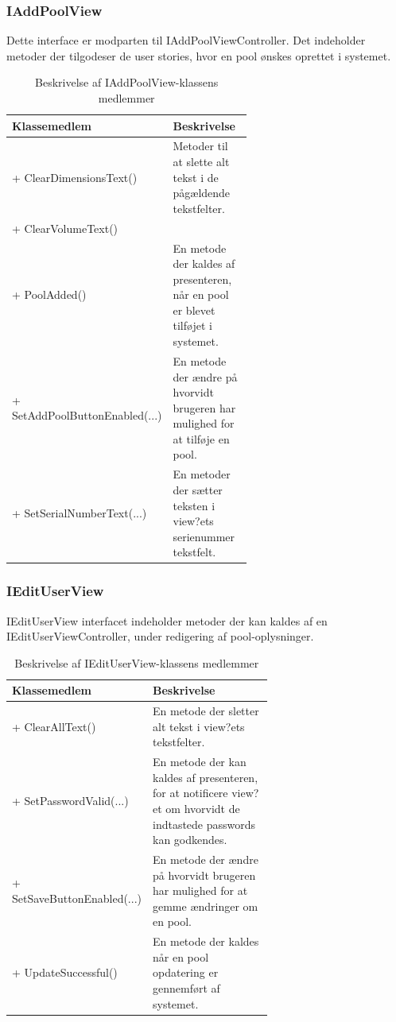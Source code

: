 \subsubsection{IAddPoolView}
Dette interface er modparten til IAddPoolViewController. Det indeholder metoder der tilgodeser de user stories, hvor en pool ønskes oprettet i systemet.

\begin{table}
	\centering
	\begin{tabular}{| l | p{0.6\linewidth} |}
		\toprule
		\textbf{Klassemedlem}	& \textbf{Beskrivelse} \\
		\midrule
		+ ClearDimensionsText()				& Metoder til at slette alt tekst i de pågældende tekstfelter. \\
		+ ClearVolumeText()					& \\\hline
		+ PoolAdded()				& En metode der kaldes af presenteren, når en pool er blevet tilføjet i systemet. \\\hline
		+ SetAddPoolButtonEnabled(...)				& En metode der ændre på hvorvidt brugeren har mulighed for at tilføje en pool. \\\hline
		+ SetSerialNumberText(...) 					& En metoder der sætter teksten i view?ets serienummer tekstfelt. \\
		\bottomrule
		\end{tabular}
	\caption{Beskrivelse af IAddPoolView-klassens medlemmer}
	\label{tab:table_design_iaddpoolview}	
\end{table}

\subsubsection{IEditUserView}
IEditUserView interfacet indeholder metoder der kan kaldes af en IEditUserViewController, under redigering af pool-oplysninger.

\begin{table}
	\centering
	\begin{tabular}{| l | p{0.65\linewidth} |}
		\toprule
		\textbf{Klassemedlem}	& \textbf{Beskrivelse} \\
		\midrule
		+ ClearAllText()				& En metode der sletter alt tekst i view?ets tekstfelter. \\\hline
		+ SetPasswordValid(...)					& En metode der kan kaldes af presenteren, for at notificere view?et om hvorvidt de indtastede passwords kan godkendes.  \\\hline
		+ SetSaveButtonEnabled(...)				& En metode der ændre på hvorvidt brugeren har mulighed for at gemme ændringer om en pool.  \\\hline
		+ UpdateSuccessful()				& En metode der kaldes når en pool opdatering er gennemført af systemet. \\
		\bottomrule
		\end{tabular}
	\caption{Beskrivelse af IEditUserView-klassens medlemmer}
	\label{tab:table_design_iedituserview}	
\end{table}

